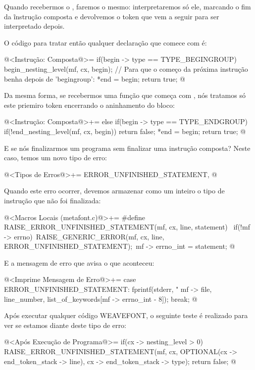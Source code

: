 Quando recebermos o , faremos o mesmo:
interpretaremos só ele, marcando o fim da ĩnstrução composta e
devolvemos o token que vem a seguir para ser interpretado depois.

O código para tratar então qualquer declaração que comece
com  é:

\iniciocodigo
@<Instrução: Composta@>=
if(begin -> type == TYPE_BEGINGROUP){
  begin_nesting_level(mf, cx, begin);
  // Para que o começo da próxima instrução benha depois de 'begingroup':
  *end = begin;
  return true;
}
@
\fimcodigo

Da mesma forma, se recebermos uma função que começa
com , nós tratamos só este priemiro token
encerrando o aninhamento do bloco:

\iniciocodigo
@<Instrução: Composta@>+=
else if(begin -> type == TYPE_ENDGROUP){
  if(!end_nesting_level(mf, cx, begin))
    return false;
  *end = begin;
  return true;
}
@
\fimcodigo

E se nós finalizarmos um programa sem finalizar uma instrução
composta? Neste caso, temos um novo tipo de erro:

\iniciocodigo
@<Tipos de Erros@>+=
ERROR_UNFINISHED_STATEMENT,
@
\fimcodigo

Quando este erro ocorrer, devemos armazenar como um inteiro o tipo de
instrução que não foi finalizada:

\iniciocodigo
@<Macros Locais (metafont.c)@>+=
#define RAISE_ERROR_UNFINISHED_STATEMENT(mf, cx, line, statement) {\
  if(!mf -> errno){\
    RAISE_GENERIC_ERROR(mf, cx, line, ERROR_UNFINISHED_STATEMENT);\
    mf -> errno_int = statement;}}
@
\fimcodigo

E a mensagem de erro que avisa o que aconteceu:

\iniciocodigo
@<Imprime Mensagem de Erro@>+=
case ERROR_UNFINISHED_STATEMENT:
  fprintf(stderr, "%
          mf -> file, line_number, list_of_keywords[mf -> errno_int - 8]);
  break;
@
\fimcodigo

Após executar qualquer código WEAVEFONT, o seguinte teste é realizado
para ver se estamos diante deste tipo de erro:

\iniciocodigo
@<Após Execução de Programa@>=
if(cx -> nesting_level > 0){
  RAISE_ERROR_UNFINISHED_STATEMENT(mf, cx,
                                  OPTIONAL(cx -> end_token_stack -> line),
                                  cx -> end_token_stack -> type);
  return false;
}
@
\fimcodigo

